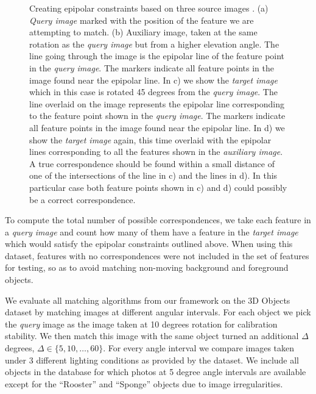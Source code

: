 \documentclass[review]{elsarticle}
\begin{document}
\begin{figure}[htb]
\begin{subfigure}[t]{0.22\columnwidth}
        \label{fig:frog_c_lines}
    \end{subfigure}%
    \caption{Creating epipolar constraints based on three source images \cite{moreels2007evaluation}.  (a) \emph{Query image} marked with the position of the feature we are attempting to match. (b) Auxiliary image, taken at the same rotation as the \emph{query image} but from a higher elevation angle. The line going through the image is the epipolar line of the feature point in the \emph{query image}.  The markers indicate all feature points in the image found near the epipolar line.  In c) we show the \emph{target image} which in this case is rotated 45 degrees from the \emph{query image}.  The line overlaid on the image represents the epipolar line corresponding to the feature point shown in the \emph{query image}.  The markers indicate all feature points in the image found near the epipolar line. In d) we show the \emph{target image} again, this time overlaid with the epipolar lines corresponding to all the features shown in the \emph{auxiliary image}. A true correspondence should be found within a small distance of one of the intersections of the line in c) and the lines in d). In this particular case both feature points shown in c) and d) could possibly be a correct correspondence.
}%
    \label{fig:frog}%
\end{figure}%

To compute the total number of possible correspondences, we take each feature in a \emph{query image} and count how many of them have a feature in the \emph{target image} which would satisfy the epipolar constraints outlined above. When using this dataset, features with no correspondences were not included in the set of features for testing, so as to avoid matching non-moving background and foreground objects.

We evaluate all matching algorithms from our framework on the 3D Objects dataset by matching images at different angular intervals. For each object we pick the \emph{query} image as the image taken at 10 degrees rotation for calibration stability.  We then match this image with the same object turned an additional $\Delta$ degrees, $\Delta \in \{5, 10, \ldots, 60\}$.  For every angle interval we compare images taken under 3 different lighting conditions as provided by the dataset. We include all objects in the database for which photos at 5 degree angle intervals are available except for the ``Rooster'' and ``Sponge'' objects due to image irregularities. 
\end{document}
